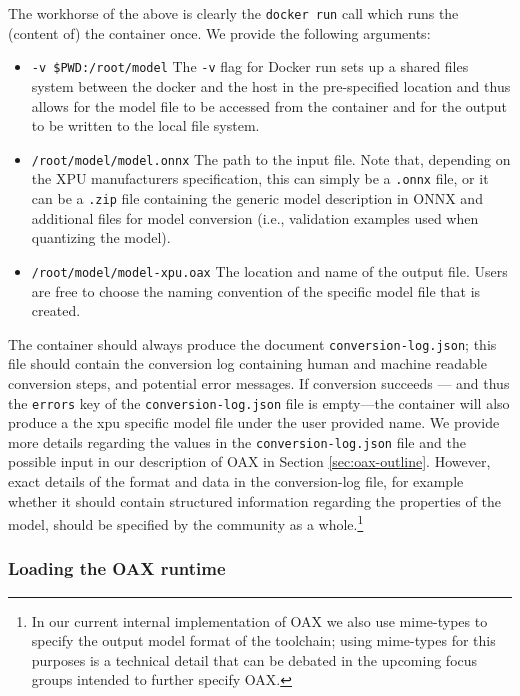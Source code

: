 \documentclass{article}
\begin{document}
The workhorse of the above is clearly the \texttt{docker run} call which runs the (content of) the container once. We provide the following arguments:
\begin{itemize}
\item \texttt{-v \$PWD:/root/model} The \texttt{-v} flag for Docker run sets up a shared files system between the docker and the host in the pre-specified location and thus allows for the model file to be accessed from the container and for the output to be written to the local file system.
\item \texttt{/root/model/model.onnx} The path to the input file. Note that, depending on the XPU manufacturers specification, this can simply be a \texttt{.onnx} file, or it can be a \texttt{.zip} file containing the generic model description in ONNX and additional files for model conversion (i.e., validation examples used when quantizing the model).
\item \texttt{/root/model/model-xpu.oax} The location and name of the output file. Users are free to choose the naming convention of the specific model file that is created.
\end{itemize}

The container should always produce the document \texttt{conversion-log.json}; this file should contain the conversion log containing human and machine readable conversion steps, and potential error messages. If conversion succeeds --- and thus the \texttt{errors} key of the \texttt{conversion-log.json} file is empty---the container will also produce a the xpu specific model file under the user provided name. We provide more details regarding the values in the \texttt{conversion-log.json} file and the possible input in our description of OAX in Section \ref{sec:oax-outline}. However, exact details of the format and data in the conversion-log file, for example whether it should contain structured information regarding the properties of the model, should be specified by the community as a whole.\footnote{In our current internal implementation of OAX we also use mime-types to specify the output model format of the toolchain; using mime-types for this purposes is a technical detail that can be debated in the upcoming focus groups intended to further specify OAX.}

\subsubsection{Loading the OAX runtime}
\end{document}
